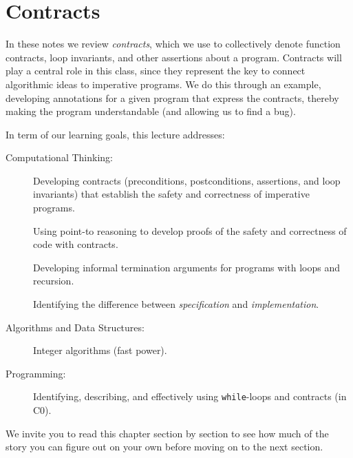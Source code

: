 \chapter{Contracts}
\label{ch:contracts}

\newcommand{\lecnum}{1}
\newcommand{\lecturer}{Frank Pfenning, Iliano Cervesato}

\maketitle

\begin{preamble}
\noindent
In these notes we review \emph{contracts}, which we use to
collectively denote function contracts, loop invariants, and other
assertions about a program.  Contracts will play a central role in
this class, since they represent the key to connect algorithmic ideas
to imperative programs.  We do this through an example, developing
annotations for a given program that express the contracts, thereby
making the program understandable (and allowing us to find a bug).
\end{preamble}

\begin{gram}
In term of our learning goals, this lecture addresses:
\begin{description}
\item[Computational Thinking:]

  Developing contracts (preconditions, postconditions, assertions, and
  loop invariants) that establish the safety and correctness of
  imperative programs.

  Using point-to reasoning to develop proofs of the safety and
  correctness of code with contracts.

  Developing informal termination arguments for
  programs with loops and recursion.

  Identifying the difference between \emph{specification} and
  \emph{implementation}.
\item[Algorithms and Data Structures:]
  Integer algorithms (fast power).
\item[Programming:] Identifying, describing, and effectively using
  \lstinline'while'-loops and contracts (in C0).
\end{description}

We invite you to read this chapter section by section to see how much of the
story you can figure out on your own before moving on to the next
section.
\end{gram}


